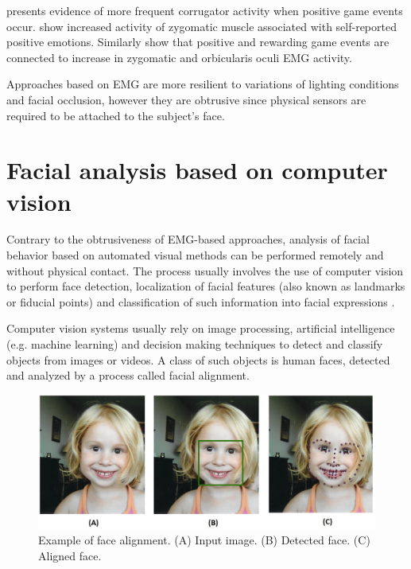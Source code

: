 \textcite{hazlett2006measuring} presents evidence of more frequent corrugator activity when positive game events occur. \textcite{tijs2008dynamic} show increased activity of zygomatic muscle associated with self-reported positive emotions. Similarly \textcite{ravaja20051} show that positive and rewarding game events are connected to increase in zygomatic and orbicularis oculi EMG activity.

Approaches based on EMG are more resilient to variations of lighting conditions and facial occlusion, however they are obtrusive since physical sensors are required to be attached to the subject's face.

\section{Facial analysis based on computer vision}

Contrary to the obtrusiveness of EMG-based approaches, analysis of facial behavior based on automated visual methods can be performed remotely and without physical contact. The process usually involves the use of computer vision to perform face detection, localization of facial features (also known as landmarks or fiducial points) and classification of such information into facial expressions \parencite{salah2010communication}.

Computer vision systems usually rely on image processing, artificial intelligence (e.g. machine learning) and decision making techniques to detect and classify objects from images or videos. A class of such objects is human faces, detected and analyzed by a process called facial alignment.

\begin{figure}[h]
    \centering
    \includegraphics[width=\linewidth]{figures/face_alignment.jpg}
    \caption{Example of face alignment. (A) Input image. (B) Detected face. (C) Aligned face.}
    \label{fig:alignment}
\end{figure}

